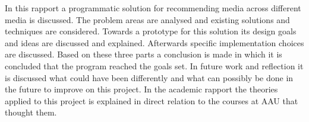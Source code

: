 In this rapport a programmatic solution for recommending media across different media is discussed. The problem areas are analysed and existing solutions and techniques are considered. Towards a prototype for this solution its design goals and ideas are discussed and explained. Afterwards specific implementation choices are discussed. Based on these three parts a conclusion is made in which it is concluded that the program reached the goals set. 
In future work and reflection it is discussed what could have been differently and what can possibly be done in the future to improve on this project.
In the academic rapport the theories applied to this project is explained in direct relation to the courses at AAU that thought them. 